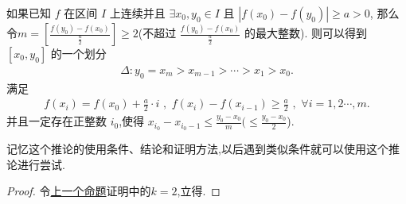 \documentclass[lang=cn,newtx,10pt,scheme=chinese]{../Template/elegantbook}
\begin{document}
\begin{corollary}\label{cor::连续函数在固定的两点之间寻找充分近的两点,同时保持两点函数值之差足够大}
    如果已知 \(f\) 在区间 \(I\) 上连续并且 \(\exists x_0,y_0\in I\) 且 \(\left| f\left( x_0 \right) -f\left( y_0 \right) \right|\geqslant  a>0\),
    那么令\(m=\left[ \frac{f\left( y_0 \right) -f\left( x_0 \right)}{\frac{a}{2}} \right]\geqslant  2\)(不超过 \(\frac{f\left( y_0 \right) -f\left( x_0 \right)}{\frac{a}{2}}\) 的最大整数).
则可以得到 \(\left[ x_0,y_0 \right]\) 的一个划分 
\begin{align*}
\Delta :y_0=x_m>x_{m - 1}>\cdots >x_1>x_0.
\end{align*}
满足 \begin{align*}
    f\left( x_i \right) = f\left( x_0 \right) + \frac{a}{2}\cdot i\,\,,\,\,f\left( x_i \right) - f\left( x_{i - 1} \right) \geqslant  \frac{a}{2}\,\,,\,\,\forall i = 1,2\cdots,m.
\end{align*}
并且一定存在正整数 \(i_0\),使得 \(x_{i_0}-x_{i_0 - 1}\leqslant  \frac{y_0 - x_0}{m}(\leqslant  \frac{y_0 - x_0}{2}\)).
\end{corollary}
\begin{remark}
    记忆这个推论的使用条件、结论和证明方法,以后遇到类似条件就可以使用这个推论进行尝试.
\end{remark}
\begin{proof}
    令\hyperref[pro:连续函数在固定的两点之间寻找充分近的两点,同时保持两点函数值之差足够大]{上一个命题}证明中的$k=2$,立得.

\end{proof}
\end{document}
